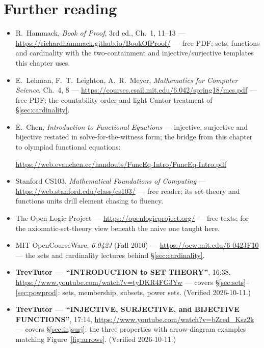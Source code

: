 \section*{Further reading}
\begin{itemize}
\item R.~Hammack, \emph{Book of Proof}, 3rd ed., Ch.~1, 11--13 ---
\url{https://richardhammack.github.io/BookOfProof/} --- free PDF; sets,
functions and cardinality with the two-containment and injective/surjective
templates this chapter uses.
\item E.~Lehman, F.~T.~Leighton, A.~R.~Meyer, \emph{Mathematics for Computer
Science}, Ch.~4, 8 ---
\url{https://courses.csail.mit.edu/6.042/spring18/mcs.pdf} --- free PDF;
the countability order and light Cantor treatment of \S\ref{sec:cardinality}.
\item E.~Chen, \emph{Introduction to Functional Equations} ---
injective, surjective and bijective restated in solve-for-the-witness
form; the bridge from this chapter to olympiad functional equations:

\url{https://web.evanchen.cc/handouts/FuncEq-Intro/FuncEq-Intro.pdf}
\item Stanford CS103, \emph{Mathematical Foundations of Computing} ---
\url{https://web.stanford.edu/class/cs103/} --- free reader; its
set-theory and functions units drill element chasing to fluency.
\item The Open Logic Project ---
\url{https://openlogicproject.org/} --- free texts; for the
axiomatic-set-theory view beneath the naive one taught here.
\item MIT OpenCourseWare, \emph{6.042J} (Fall 2010) ---
\url{https://ocw.mit.edu/6-042JF10} --- the sets and cardinality
lectures behind \S\ref{sec:cardinality}.
\end{itemize}

\begin{rulebox}
\begin{itemize}
\item \textbf{TrevTutor --- ``INTRODUCTION to SET THEORY''}, 16:38,
\url{https://www.youtube.com/watch?v=tyDKR4FG3Yw} --- covers
\S\ref{sec:sets}--\ref{sec:powprod}: sets, membership, subsets,
power sets. (Verified 2026-10-11.)
\item \textbf{TrevTutor --- ``INJECTIVE, SURJECTIVE, and BIJECTIVE
FUNCTIONS''}, 17:14,
\url{https://www.youtube.com/watch?v=bZred_Ksz2k} --- covers
\S\ref{sec:injsurj}: the three properties with arrow-diagram examples
matching Figure~\ref{fig:arrows}. (Verified 2026-10-11.)
\end{itemize}
\end{rulebox}

